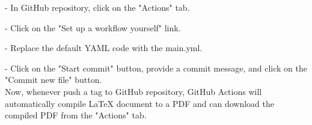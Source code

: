 \documentclass[12pt]{article}
\begin{document}
- In GitHub repository, click on the "Actions" tab.

- Click on the "Set up a workflow yourself" link.

- Replace the default YAML code with the main.yml.

- Click on the "Start commit" button, provide a commit message, and click on the "Commit new file" button.\\
Now, whenever push a tag to  GitHub repository, GitHub Actions will automatically compile  LaTeX document to a PDF and can download the compiled PDF from the "Actions" tab.
\end{document}
